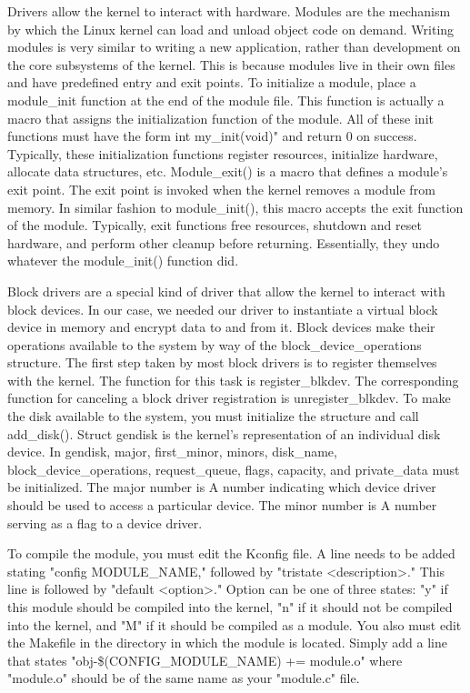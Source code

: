 \documentclass[10pt,draftclsnofoot,onecolumn,journal,compsoc]{IEEEtran}
\begin{document}
Drivers allow the kernel to interact with hardware. Modules are the mechanism by which the Linux kernel can load and unload object code on demand. Writing modules is very similar to writing a new application, rather than development on the core subsystems of the kernel. This is because modules live in their own files and have predefined entry and exit points. To initialize a module, place a module\_init function at the end of the module file. This function is actually a macro that assigns the initialization function of the module. All of these init functions must have the form int my\_init(void)" and return 0 on success. Typically, these initialization functions register resources, initialize hardware, allocate data structures, etc. Module\_exit() is a macro that defines a module's exit point. The exit point is invoked when the kernel removes a module from memory. In similar fashion to module\_init(), this macro accepts the exit function of the module. Typically, exit functions free resources, shutdown and reset hardware, and perform other cleanup before returning. Essentially, they undo whatever the module\_init() function did.

Block drivers are a special kind of driver that allow the kernel to interact with block devices. In our case, we needed our driver to instantiate a virtual block device in memory and encrypt data to and from it. Block devices make their operations available to the system by way of the block\_device\_operations structure. The first step taken by most block drivers is to register themselves with the kernel. The function for this task is register\_blkdev. The corresponding function for canceling a block driver registration is unregister\_blkdev. To make the disk available to the system, you must initialize the structure and call add\_disk(). Struct gendisk is the kernel's representation of an individual disk device. In gendisk, major, first\_minor, minors, disk\_name, block\_device\_operations, request\_queue, flags, capacity, and private\_data must be initialized. The major number is A number indicating which device driver should be used to access a particular device. The minor number is A number serving as a flag to a device driver.

To compile the module, you must edit the Kconfig file. A line needs to be added stating "config MODULE\_NAME," followed by "tristate <description>." This line is followed by "default <option>." Option can be one of three states: "y" if this module should be compiled into the kernel, "n" if it should not be compiled into the kernel, and "M" if it should be compiled as a module. You also must edit the Makefile in the directory in which the module is located. Simply add a line that states "obj-\$(CONFIG\_MODULE\_NAME) += module.o" where "module.o" should be of the same name as your "module.c" file.
\end{document}
